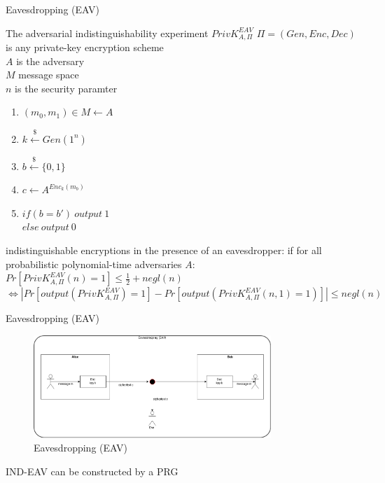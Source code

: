 \documentclass[ucs,9pt]{beamer}
\begin{document}
\begin{frame}{Eavesdropping (EAV)}
    \begin{block}{The adversarial indistinguishability experiment $PrivK_{A,\Pi}^{EAV}$}
        $\Pi = (Gen, Enc, Dec)$ is any private-key encryption scheme\\
        $A$ is the adversary\\
        $M$ message space\\
        $n$ is the security paramter\\
        
        \begin{enumerate}
            \item $(m_0,m_1) \in M \leftarrow A$
            \item $k \overset{\$}{\leftarrow} Gen(1^n)$
            \item $b \overset{\$}{\leftarrow} \{0,1\}$
            \item $c \leftarrow A^{Enc_{k}(m_b)}$
                \item $if(b = b')\ output\ 1$ \\
                $else\ output\ 0$
        \end{enumerate}
        
        indistinguishable encryptions in the presence of an eavesdropper: if for all probabilistic polynomial-time adversaries $A$:\\
        $Pr[PrivK_{A,\Pi}^{EAV}(n) = 1] \leq \frac{1}{2} + negl(n)$
        $\Leftrightarrow \left | Pr[output(PrivK_{A,\Pi}^{EAV}) = 1] - Pr[output(PrivK_{A,\Pi}^{EAV}(n,1) = 1)] \right | \leq negl(n)$
    \end{block}
\end{frame}

\begin{frame}{Eavesdropping (EAV)}
    
    \begin{figure}[h]
        \centering
        \includegraphics[width=0.8\textwidth]{figures/EAV.png}
        \caption{Eavesdropping (EAV)}
    \end{figure}
    IND-EAV can be constructed by a PRG
\end{frame}
\end{document}
